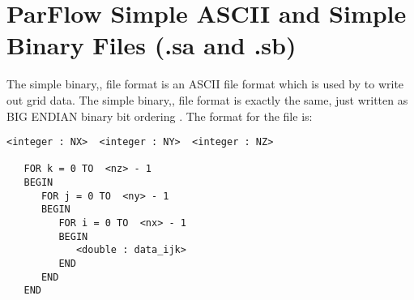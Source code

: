 \section{ParFlow Simple ASCII  and Simple Binary Files (.sa and .sb)}
\label{ParFlow Simple ASCII Files (.sa and .sb)}

The simple binary,, file format is an ASCII file format which is used by 
to write out \parflow{} grid data.  The simple binary,, file format is exactly the same, just written as BIG ENDIAN binary bit ordering \cite{endian}.
The format for the file is:

\begin{display}\begin{verbatim}
<integer : NX>  <integer : NY>  <integer : NZ>

   FOR k = 0 TO  <nz> - 1
   BEGIN
      FOR j = 0 TO  <ny> - 1
      BEGIN
         FOR i = 0 TO  <nx> - 1
         BEGIN
            <double : data_ijk>
         END
      END
   END
\end{verbatim}\end{display}


